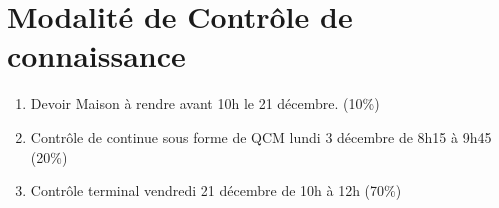 \documentclass[12pt,a4paper,openany]{book}
\begin{document}
	\frontmatter
	\setcounter{tocdepth}{1}
	\setcounter{secnumdepth}{3}
	\setcounter{minitocdepth}{1}
	\dominitoc
	\maketitle
	\chapter*{Modalité de Contrôle de connaissance}
	\begin{enumerate}
		\item Devoir Maison à rendre avant 10h le 21 décembre. (10\%)
		\item Contrôle de continue sous forme de QCM lundi 3 décembre de 8h15 à 9h45 (20\%)
		\item Contrôle terminal vendredi 21 décembre de 10h à 12h (70\%)
	\end{enumerate}
	\tableofcontents
	\mainmatter
	
	
	
	
	\appendix
	
\end{document}
